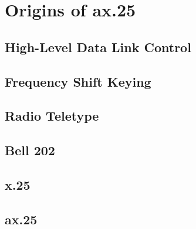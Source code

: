 \chapter{Origins of ax.25}

\section{High-Level Data Link Control}

\section{Frequency Shift Keying}

\section{Radio Teletype}

\section{Bell 202}

\section{x.25}

\section{ax.25}
